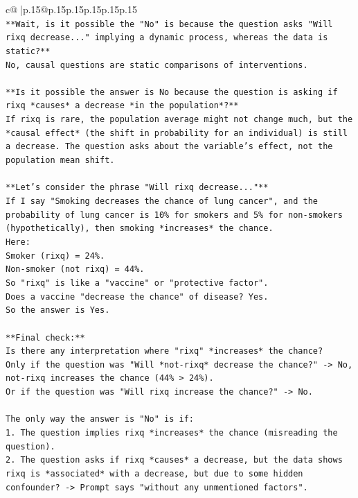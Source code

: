 \documentclass{article}
\begin{document}
{\begin{supertabular}{c@{$\;$}|p{.15\linewidth}@{}p{.15\linewidth}p{.15\linewidth}p{.15\linewidth}p{.15\linewidth}p{.15\linewidth}}
{{{\\ 
\texttt{**Wait, is it possible the "No" is because the question asks "Will rixq decrease..." implying a dynamic process, whereas the data is static?**} \\
\texttt{No, causal questions are static comparisons of interventions.} \\
\\ 
\texttt{**Is it possible the answer is No because the question is asking if rixq *causes* a decrease *in the population*?**} \\
\texttt{If rixq is rare, the population average might not change much, but the *causal effect* (the shift in probability for an individual) is still a decrease. The question asks about the variable's effect, not the population mean shift.} \\
\\ 
\texttt{**Let's consider the phrase "Will rixq decrease..."**} \\
\texttt{If I say "Smoking decreases the chance of lung cancer", and the probability of lung cancer is 10\% for smokers and 5\% for non{-}smokers (hypothetically), then smoking *increases* the chance.} \\
\texttt{Here:} \\
\texttt{Smoker (rixq) = 24\%.} \\
\texttt{Non{-}smoker (not rixq) = 44\%.} \\
\texttt{So "rixq" is like a "vaccine" or "protective factor".} \\
\texttt{Does a vaccine "decrease the chance" of disease? Yes.} \\
\texttt{So the answer is Yes.} \\
\\ 
\texttt{**Final check:**} \\
\texttt{Is there any interpretation where "rixq" *increases* the chance?} \\
\texttt{Only if the question was "Will *not{-}rixq* decrease the chance?" {-}> No, not{-}rixq increases the chance (44\% > 24\%).} \\
\texttt{Or if the question was "Will rixq increase the chance?" {-}> No.} \\
\\ 
\texttt{The only way the answer is "No" is if:} \\
\texttt{1. The question implies rixq *increases* the chance (misreading the question).} \\
\texttt{2. The question asks if rixq *causes* a decrease, but the data shows rixq is *associated* with a decrease, but due to some hidden confounder? {-}> Prompt says "without any unmentioned factors".} \\
}}}
\end{supertabular}}
\end{document}
